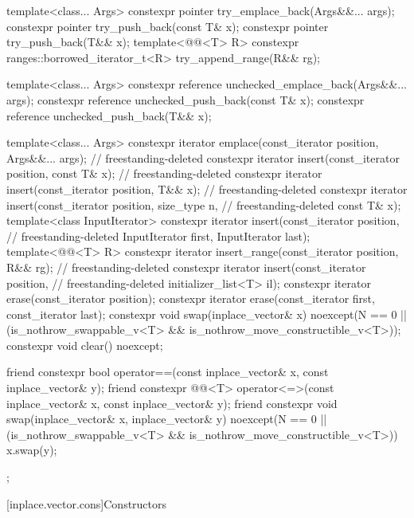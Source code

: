 \begin{codeblock}
{{    template<class... Args>
      constexpr pointer try_emplace_back(Args&&... args);
    constexpr pointer try_push_back(const T& x);
    constexpr pointer try_push_back(T&& x);
    template<@@<T> R>
      constexpr ranges::borrowed_iterator_t<R> try_append_range(R&& rg);

    template<class... Args>
      constexpr reference unchecked_emplace_back(Args&&... args);
    constexpr reference unchecked_push_back(const T& x);
    constexpr reference unchecked_push_back(T&& x);

    template<class... Args>
      constexpr iterator emplace(const_iterator position, Args&&... args);  // freestanding-deleted
    constexpr iterator insert(const_iterator position, const T& x);         // freestanding-deleted
    constexpr iterator insert(const_iterator position, T&& x);              // freestanding-deleted
    constexpr iterator insert(const_iterator position, size_type n,         // freestanding-deleted
                              const T& x);
    template<class InputIterator>
      constexpr iterator insert(const_iterator position,                    // freestanding-deleted
                                InputIterator first, InputIterator last);
    template<@@<T> R>
      constexpr iterator insert_range(const_iterator position, R&& rg);     // freestanding-deleted
    constexpr iterator insert(const_iterator position,                      // freestanding-deleted
                              initializer_list<T> il);
    constexpr iterator erase(const_iterator position);
    constexpr iterator erase(const_iterator first, const_iterator last);
    constexpr void swap(inplace_vector& x)
      noexcept(N == 0 || (is_nothrow_swappable_v<T> &&
                          is_nothrow_move_constructible_v<T>));
    constexpr void clear() noexcept;

    friend constexpr bool operator==(const inplace_vector& x,
                                     const inplace_vector& y);
    friend constexpr @@<T>
      operator<=>(const inplace_vector& x, const inplace_vector& y);
    friend constexpr void swap(inplace_vector& x, inplace_vector& y)
      noexcept(N == 0 || (is_nothrow_swappable_v<T> &&
                          is_nothrow_move_constructible_v<T>))
      { x.swap(y); }
  };
}
\end{codeblock}

[inplace.vector.cons]{Constructors}

